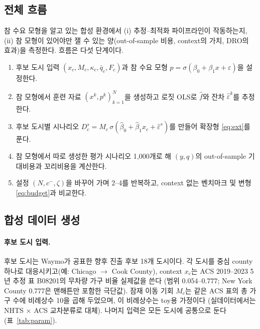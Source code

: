 \documentclass[10pt,a4paper]{article}
\begin{document}
\subsection{전체 흐름}

참 수요 모형을 알고 있는 합성 환경에서 (i) 추정--최적화 파이프라인이 작동하는지, (ii) 참 모형이 있어야만 잴 수 있는 양(out-of-sample 비용, context의 가치, DRO의 효과)을 측정한다. 흐름은 다섯 단계이다.
\begin{enumerate}[nosep]
  \item 후보 도시 입력 $(x_c, M_c, \kappa_c, \bar q_c, F_c)$과 참 수요 모형 $p=\sigma(\beta_0+\beta_1 x+\varepsilon)$을 설정한다.
  \item 참 모형에서 훈련 자료 $(x^k,p^k)_{k=1}^N$을 생성하고 로짓 OLS로 $\hat f$와 잔차 $\hat\varepsilon^k$를 추정한다.
  \item 후보 도시별 시나리오 $D_c^s=M_c\,\sigma(\hat\beta_0+\hat\beta_1x_c+\hat\varepsilon^s)$를 만들어 확장형 \eqref{eq:ext}를 푼다.
  \item 참 모형에서 따로 생성한 평가 시나리오 1{,}000개로 해 $(y,q)$의 out-of-sample 기대비용과 꼬리비용을 계산한다.
  \item 설정 $(N, c^-, \zeta)$을 바꾸어 가며 2--4를 반복하고, context 없는 벤치마크 및 변형 \eqref{eq:budget}과 비교한다.
\end{enumerate}

\subsection{합성 데이터 생성}\label{sec:data}

\paragraph{후보 도시 입력.}
후보 도시는 Waymo가 공표한 향후 진출 후보 18개 도시이다. 각 도시를 중심 county 하나로 대응시키고(예: Chicago $\to$ Cook County), context $x_c$는 ACS 2019--2023 5년 추정 표 B08201의 무차량 가구 비율 실제값을 쓴다 (범위 $0.054$--$0.777$; New York County 0.777은 맨해튼만 포함한 극단값). 잠재 이동 기회 $M_c$는 같은 ACS 표의 총 가구 수에 비례상수 10을 곱해 두었으며, 이 비례상수는 toy용 가정이다 (실데이터에서는 NHTS $\times$ ACS 교차분류로 대체). 나머지 입력은 모든 도시에 공통으로 둔다 (표~\ref{tab:param}).
\end{document}
